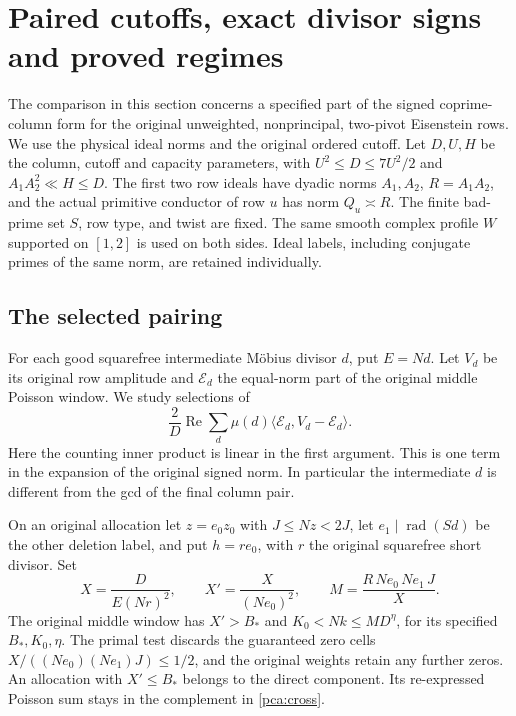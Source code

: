 \section{Paired cutoffs, exact divisor signs and proved regimes}\label{pca:core}

The comparison in this section concerns a specified part of the signed
coprime-column form for the original unweighted, nonprincipal, two-pivot
Eisenstein rows. We use the physical ideal norms and the original ordered
cutoff. Let \(D,U,H\) be the column, cutoff and capacity parameters, with
\(U^2\le D\le 7U^2/2\) and \(A_1A_2^2\ll H\le D\). The first two row ideals have
dyadic norms \(A_1,A_2\), \(R=A_1A_2\), and the actual primitive conductor of
row \(u\) has norm \(Q_u\asymp R\). The finite bad-prime set \(S\), row type,
and twist are fixed. The same smooth complex profile \(W\) supported on
\([1,2]\) is used on both sides. Ideal labels, including conjugate primes
of the same norm, are retained individually.

\subsection{The selected pairing}\label{pca:pair}
For each good squarefree intermediate M\"obius divisor \(d\), put \(E=Nd\).
Let \(V_d\) be its original row amplitude and \(\mathcal E_d\) the
equal-norm part of the original middle Poisson window. We study selections
of
\begin{equation}\label{pca:cross}
 \frac{2}{D}\operatorname{Re}\sum_d\mu(d)
       \langle \mathcal E_d,V_d-\mathcal E_d\rangle .
\end{equation}
Here the counting inner product is linear in the first argument. This is
one term in the expansion of the original signed norm. In particular the
intermediate \(d\) is different from the gcd of the final column pair.

On an original allocation let \(z=e_0z_0\) with
\(J\le Nz<2J\), let \(e_1\mid\operatorname{rad}(Sd)\) be the other deletion
label, and put \(h=re_0\), with \(r\) the original squarefree short divisor.
Set
\[
 X=\frac{D}{E(Nr)^2},\qquad X'=\frac{X}{(Ne_0)^2},
 \qquad M=\frac{R\,Ne_0\,Ne_1\,J}{X}.
\]
The original middle window has \(X'>B_*\) and \(K_0<Nk\le M D^\eta\),
for its specified \(B_*,K_0,\eta\). The primal test discards the guaranteed zero cells
\(X/((Ne_0)(Ne_1)J)\le 1/2\), and the original weights retain any
further zeros. An allocation
with \(X'\le B_*\) belongs to the direct component. Its re-expressed
Poisson sum stays in the complement in \eqref{pca:cross}.

